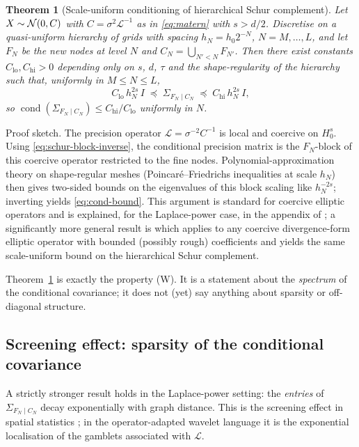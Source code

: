 \documentclass[11pt]{amsart}
\newcommand{\cL}{\mathcal{L}} \newcommand{\cF}{\mathcal{F}}
\DeclareMathOperator{\cond}{cond}
\newtheorem{theorem}{Theorem}[section]
\theoremstyle{remark}
\numberwithin{equation}{section}
\begin{document}
\begin{theorem}[Scale-uniform conditioning of hierarchical Schur complement]
\label{thm:cond}
Let $X\sim\mathcal{N}(0,C)$ with $C=\sigma^2\cL^{-1}$ as in \eqref{eq:matern} with $s>d/2$. Discretise on a quasi-uniform hierarchy of grids with spacing $h_N=h_0 2^{-N}$, $N=M,\ldots,L$, and let $F_N$ be the new nodes at level $N$ and $C_N=\bigcup_{N'<N}F_{N'}$. Then there exist constants $C_{\mathrm{lo}},C_{\mathrm{hi}}>0$ depending only on $s$, $d$, $\tau$ and the shape-regularity of the hierarchy such that, uniformly in $M\le N\le L$,
\begin{equation}
\label{eq:cond-bound}
 C_{\mathrm{lo}}\, h_N^{2s}\, I \;\preceq\; \Sigma_{F_N\mid C_N} \;\preceq\; C_{\mathrm{hi}}\, h_N^{2s}\, I,
\end{equation}
so $\cond(\Sigma_{F_N\mid C_N})\le C_{\mathrm{hi}}/C_{\mathrm{lo}}$ uniformly in $N$.
\end{theorem}
Proof sketch. The precision operator $\cL=\sigma^{-2}C^{-1}$ is local and coercive on $H_0^s$. Using \eqref{eq:schur-block-inverse}, the conditional precision matrix is the $F_N$-block of this coercive operator restricted to the fine nodes. Polynomial-approximation theory on shape-regular meshes (Poincar\'e--Friedrichs inequalities at scale $h_N$) then gives two-sided bounds on the eigenvalues of this block scaling like $h_N^{-2s}$; inverting yields \eqref{eq:cond-bound}. This argument is standard for coercive elliptic operators and is explained, for the Laplace-power case, in the appendix of \cite{chen2021consistency}; a significantly more general result is \cite[Theorem 13.10]{owhadi2019operator} which applies to any coercive divergence-form elliptic operator with bounded (possibly rough) coefficients and yields the same scale-uniform bound on the hierarchical Schur complement.

Theorem~\ref{thm:cond} is exactly the property (W). It is a statement about the \emph{spectrum} of the conditional covariance; it does not (yet) say anything about sparsity or off-diagonal structure.

\subsection{Screening effect: sparsity of the conditional covariance}
A strictly stronger result holds in the Laplace-power setting: the \emph{entries} of $\Sigma_{F_N\mid C_N}$ decay exponentially with graph distance. This is the screening effect in spatial statistics \cite{stein2002screening}; in the operator-adapted wavelet language \cite{owhadi2019operator} it is the exponential localisation of the gamblets associated with $\cL$.
\end{document}
